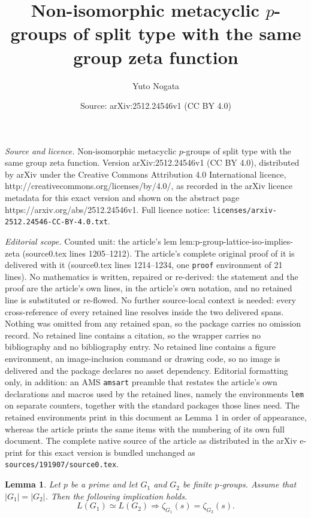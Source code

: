 \documentclass[10pt,a4paper]{amsart}
\title{Non-isomorphic metacyclic $p$-groups of split type with the same group zeta function}
\author{Yuto Nogata}
\date{Source: arXiv:2512.24546v1 (CC BY 4.0)}
\newtheorem{lem}{Lemma}
\begin{document}
\maketitle

\noindent\emph{Source and licence.} Non-isomorphic metacyclic $p$-groups of split type with the same group zeta function. Version arXiv:2512.24546v1 (CC BY 4.0), distributed by arXiv under the Creative Commons Attribution 4.0 International licence, http://creativecommons.org/licenses/by/4.0/, as recorded in the arXiv licence metadata for this exact version and shown on the abstract page https://arxiv.org/abs/2512.24546v1. Full licence notice: \texttt{licenses/arxiv-2512.24546-CC-BY-4.0.txt}.\par\smallskip

\noindent\textit{Editorial scope.} Counted unit: the article's lem lem:p-group-lattice-iso-implies-zeta (source0.tex lines 1205--1212). The article's complete original proof of it is delivered with it (source0.tex lines 1214--1234, one \texttt{proof} environment of 21 lines). No mathematics is written, repaired or re-derived: the statement and the proof are the article's own lines, in the article's own notation, and no retained line is substituted or re-flowed.  No further source-local context is needed: every cross-reference of every retained line resolves inside the two delivered spans.  Nothing was omitted from any retained span, so the package carries no omission record.  No retained line contains a citation, so the wrapper carries no bibliography and no bibliography entry.  No retained line contains a figure environment, an image-inclusion command or drawing code, so no image is delivered and the package declares no asset dependency.  Editorial formatting only, in addition: an AMS \texttt{amsart} preamble that restates the article's own declarations and macros used by the retained lines, namely the environments \texttt{lem} on separate counters, together with the standard packages those lines need.  The retained environments print in this document as Lemma 1 in order of appearance, whereas the article prints the same items with the numbering of its own full document.  The complete native source of the article as distributed in the arXiv e-print for this exact version is bundled unchanged as \texttt{sources/191907/source0.tex}.
\begin{lem}\label{lem:p-group-lattice-iso-implies-zeta}
Let $p$ be a prime and let $G_{1}$ and $G_{2}$ be finite $p$-groups.
Assume that $|G_{1}|=|G_{2}|$.
Then the following implication holds.
\[
  L(G_{1})\simeq L(G_{2}) \Longrightarrow \zeta_{G_{1}}(s) = \zeta_{G_{2}}(s).
\]
\end{lem}
\end{document}
